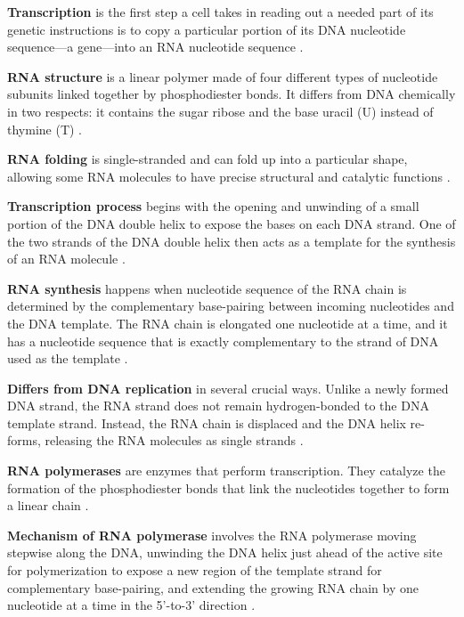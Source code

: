 \textbf{Transcription} is the first step a cell takes in reading out a needed part of its genetic instructions is to copy a particular portion of its DNA nucleotide sequence—a gene—into an RNA nucleotide sequence \cite*{L1-Chapter6}.

\textbf{RNA structure} is a linear polymer made of four different types of nucleotide subunits linked together by phosphodiester bonds. It differs from DNA chemically in two respects: it contains the sugar ribose and the base uracil (U) instead of thymine (T) \cite*{L1-Chapter6}.

\textbf{RNA folding} is single-stranded and can fold up into a particular shape, allowing some RNA molecules to have precise structural and catalytic functions \cite*{L1-Chapter6}.

\textbf{Transcription process} begins with the opening and unwinding of a small portion of the DNA double helix to expose the bases on each DNA strand. One of the two strands of the DNA double helix then acts as a template for the synthesis of an RNA molecule \cite*{L1-Chapter6}.

\textbf{RNA synthesis} happens when nucleotide sequence of the RNA chain is determined by the complementary base-pairing between incoming nucleotides and the DNA template. The RNA chain is elongated one nucleotide at a time, and it has a nucleotide sequence that is exactly complementary to the strand of DNA used as the template \cite*{L1-Chapter6}.

\textbf{Differs from DNA replication} in several crucial ways. Unlike a newly formed DNA strand, the RNA strand does not remain hydrogen-bonded to the DNA template strand. Instead, the RNA chain is displaced and the DNA helix re-forms, releasing the RNA molecules as single strands \cite*{L1-Chapter6}.

\textbf{RNA polymerases} are enzymes that perform transcription. They catalyze the formation of the phosphodiester bonds that link the nucleotides together to form a linear chain \cite*{L1-Chapter6}.

\textbf{Mechanism of RNA polymerase} involves the RNA polymerase moving stepwise along the DNA, unwinding the DNA helix just ahead of the active site for polymerization to expose a new region of the template strand for complementary base-pairing, and extending the growing RNA chain by one nucleotide at a time in the 5'-to-3' direction \cite*{L1-Chapter6}.

